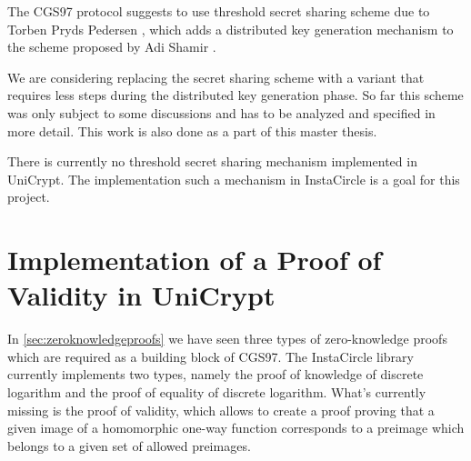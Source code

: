 \documentclass[numbers=noenddot, abstract=on, a4paper, headsepline,
footsepline, oneside, draft=off]{scrreprt}
\begin{document}
The CGS97 protocol suggests to use threshold secret sharing scheme due to Torben
Pryds Pedersen \cite{PED91}, which adds a distributed key generation mechanism to the
scheme proposed by Adi Shamir \cite{Shamir79}. 

We are considering replacing the secret sharing scheme with a variant that
requires less steps during the distributed key generation phase. So far this
scheme was only subject to some discussions and has to be analyzed and specified
in more detail. This work is also done as a part of this master thesis.

There is currently no threshold secret sharing mechanism implemented in
UniCrypt. The implementation such a mechanism in InstaCircle is a goal
for this project.


\section{Implementation of a Proof of Validity in UniCrypt}
\label{sec:proofofvalidity}
In \vref{sec:zeroknowledgeproofs} we have seen three types of zero-knowledge
proofs which are required as a building block of CGS97. The InstaCircle library
currently implements two types, namely the proof of knowledge of discrete
logarithm and the proof of equality of discrete logarithm. What's currently
missing is the proof of validity, which allows to create a proof proving that
a given image of a homomorphic one-way function corresponds to a preimage which
belongs to a given set of allowed preimages. 
\end{document}
